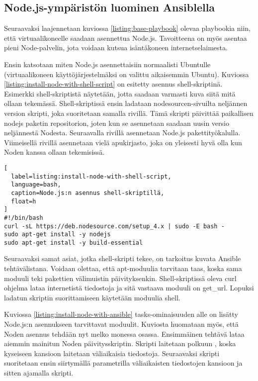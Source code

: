 \subsection{Node.js-ympäristön luominen Ansiblella}

Seuraavaksi laajennetaan kuviossa \ref{listing:base-playbook} olevaa playbookia niin, että virtuaalikoneelle saadaan asennettua Node.js. Tavoitteena on myös asentaa pieni Node-palvelin, jota voidaan kutsua isäntäkoneen internetselaimesta.

Ensin katsotaan miten Node.js asennettaisiin normaalisti Ubuntulle (virtuaalikoneen käyttöjärjestelmäksi on valittu aikaisemmin Ubuntu). Kuviossa \ref{listing:install-node-with-shell-script} on esitetty asennus shell-skriptinä. Esimerkki shell-skriptistä näytetään, jotta saadaan varmasti kuva siitä mitä ollaan tekemässä. Shell-skriptissä ensin ladataan nodesourcen-sivuilta neljännen version skripti, joka suoritetaan samalla rivillä. Tämä skripti päivittää paikallisen nodejs paketin repositorion, joten kun se asennetaan saadaan uusin versio neljännestä Nodesta. Seuraavalla rivillä asennetaan Node.js pakettityökalulla. Viimeisellä rivillä asennetaan vielä apukirjasto, joka on yleisesti hyvä olla kun Noden kanssa ollaan tekemisissä.

\begin{lstlisting}[
  label=listing:install-node-with-shell-script,
  language=bash,
  caption=Node.js:n asennus shell-skriptillä,
  float=h
]
#!/bin/bash
curl -sL https://deb.nodesource.com/setup_4.x | sudo -E bash -
sudo apt-get install -y nodejs
sudo apt-get install -y build-essential
\end{lstlisting}

Seuraavaksi samat asiat, jotka shell-skripti tekee, on tarkoitus kuvata Ansible tehtävälistana. Voidaan olettaa, että apt-moduulia tarvitaan taas, koska sama moduuli teki pakettien välimuistin päivityksenkin. Shell-skriptissä oleva curl ohjelma lataa internetistä tiedostoja ja sitä vastaava moduuli on get\_url. Lopuksi ladatun skriptin suorittamiseen käytetään moduulia shell.

Kuviossa \ref{listing:install-node-with-ansible} tasks-ominaisuuden alle on lisätty Node.js:n asennukseen tarvittavat moduulit. Kuviosta huomataan myös, että Noden asennus tehdään nyt melko monessa osassa. Ensimmäinen tehtävä lataa aiemmin mainitun Noden päivitysskriptin. Skripti laitetaan polkuun , koska kyseiseen kansioon laitetaan väliaikaisia tiedostoja. Seuraavaksi skripti suoritetaan ensin siirtymällä parametrilla  väliaikaisten tiedostojen kansioon ja sitten ajamalla skripti.

